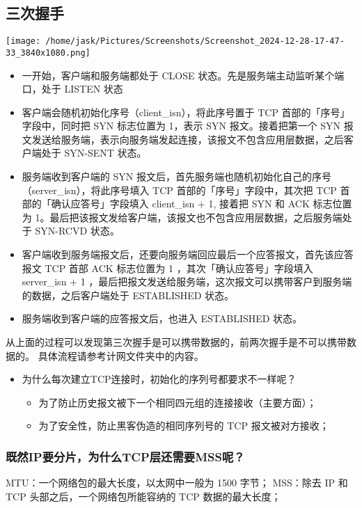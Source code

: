 \documentclass[11pt]{article}
\begin{document}
\subsection{三次握手}
\label{sec:org57a4859}
\begin{center}
\texttt{[image: /home/jask/Pictures/Screenshots/Screenshot\_2024-12-28-17-47-33\_3840x1080.png]}
\end{center}
\begin{itemize}
\item 一开始，客户端和服务端都处于 CLOSE 状态。先是服务端主动监听某个端口，处于 LISTEN 状态
\item 客户端会随机初始化序号（client\_isn），将此序号置于 TCP 首部的「序号」字段中，同时把 SYN 标志位置为 1，表示 SYN 报文。接着把第一个 SYN 报文发送给服务端，表示向服务端发起连接，该报文不包含应用层数据，之后客户端处于 SYN-SENT 状态。
\item 服务端收到客户端的 SYN 报文后，首先服务端也随机初始化自己的序号（server\_isn），将此序号填入 TCP 首部的「序号」字段中，其次把 TCP 首部的「确认应答号」字段填入 client\_isn + 1, 接着把 SYN 和 ACK 标志位置为 1。最后把该报文发给客户端，该报文也不包含应用层数据，之后服务端处于 SYN-RCVD 状态。
\item 客户端收到服务端报文后，还要向服务端回应最后一个应答报文，首先该应答报文 TCP 首部 ACK 标志位置为 1 ，其次「确认应答号」字段填入 server\_isn + 1 ，最后把报文发送给服务端，这次报文可以携带客户到服务端的数据，之后客户端处于 ESTABLISHED 状态。
\item 服务端收到客户端的应答报文后，也进入 ESTABLISHED 状态。
\end{itemize}

从上面的过程可以发现第三次握手是可以携带数据的，前两次握手是不可以携带数据的。
具体流程请参考计网文件夹中的内容。
\begin{itemize}
\item 为什么每次建立TCP连接时，初始化的序列号都要求不一样呢？
\begin{itemize}
\item 为了防止历史报文被下一个相同四元组的连接接收（主要方面）；
\item 为了安全性，防止黑客伪造的相同序列号的 TCP 报文被对方接收；
\end{itemize}
\end{itemize}
\subsubsection{既然IP要分片，为什么TCP层还需要MSS呢？}
\label{sec:org7217094}
MTU：一个网络包的最大长度，以太网中一般为 1500 字节；
MSS：除去 IP 和 TCP 头部之后，一个网络包所能容纳的 TCP 数据的最大长度；
\end{document}
